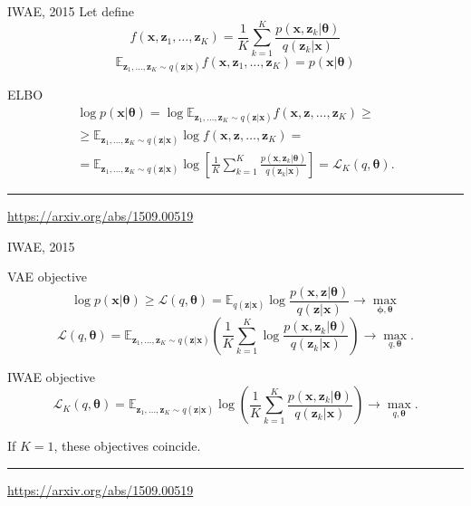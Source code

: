 \documentclass{beamer}
\newcommand{\bx}{\mathbf{x}}
\newcommand{\bz}{\mathbf{z}}
\newcommand{\btheta}{\boldsymbol{\theta}}
\newcommand{\bphi}{\boldsymbol{\phi}}
\begin{document}
\begin{frame}{IWAE, 2015}
	Let define
	\[
	f(\bx, \bz_1, \dots, \bz_K) = \frac{1}{K} \sum_{k=1}^K \frac{p(\bx, \bz_k | \btheta)}{q(\bz_k | \bx)}
	\]
	\[
		\mathbb{E}_{\bz_1, \dots, \bz_K \sim q(\bz | \bx)} f(\bx, \bz_1, \dots, \bz_K) = p(\bx | \btheta)
	\]
	\vspace{-0.3cm}
	\begin{block}{ELBO}
		\vspace{-0.5cm}
		\begin{multline*}
			\log p(\bx | \btheta) = \log \mathbb{E}_{\bz_1, \dots, \bz_K \sim q(\bz | \bx)} f(\bx, \bz, \dots, \bz_K) \geq \\
			\geq \mathbb{E}_{\bz_1, \dots, \bz_K \sim q(\bz | \bx)} \log f(\bx, \bz, \dots, \bz_K) = \\
			= \mathbb{E}_{\bz_1, \dots, \bz_K \sim q(\bz | \bx)} \log \left[\frac{1}{K} \sum_{k=1}^K\frac{p(\bx, \bz_k | \btheta)}{q(\bz_k | \bx)} \right] = \mathcal{L}_K(q, \btheta).
		\end{multline*}
	\end{block}
	\vfill
	\hrule\medskip
	{\scriptsize \href{https://arxiv.org/abs/1509.00519}{https://arxiv.org/abs/1509.00519}}
\end{frame}
\begin{frame}{IWAE, 2015}
\begin{block}{VAE objective}
	\vspace{-0.2cm}
	\[
	\log p(\bx | \btheta) \geq \mathcal{L} (q, \btheta)  = \mathbb{E}_{q(\bz | \bx)} \log \frac{p(\bx, \bz | \btheta)}{q(\bz| \bx)} \rightarrow \max_{\bphi, \btheta}
	\]
	\[
	\mathcal{L} (q, \btheta)  = \mathbb{E}_{\bz_1, \dots, \bz_K \sim q(\bz | \bx)} \left( \frac{1}{K} \sum_{k=1}^K \log \frac{p(\bx, \bz_k | \btheta)}{q(\bz_k| \bx)} \right) \rightarrow \max_{q, \btheta}.
	\]
	\vspace{-0.2cm}
\end{block}
\begin{block}{IWAE objective}
	\vspace{-0.2cm}
	\[
	\mathcal{L}_K (q, \btheta)  = \mathbb{E}_{\bz_1, \dots, \bz_K \sim q(\bz | \bx)} \log \left( \frac{1}{K}\sum_{k=1}^K\frac{p(\bx, \bz_k | \btheta)}{q(\bz_k| \bx)} \right) \rightarrow \max_{q, \btheta}.
	\]
\end{block}
If $K=1$, these objectives coincide.

\vfill
\hrule\medskip
{\scriptsize \href{https://arxiv.org/abs/1509.00519}{https://arxiv.org/abs/1509.00519}}
\end{frame}
\end{document}
